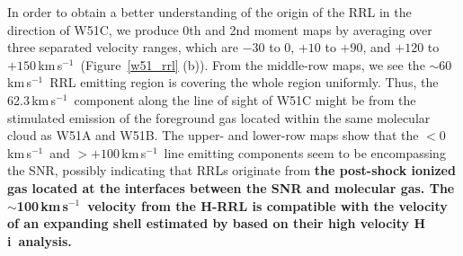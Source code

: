 \documentclass[manuscript]{aastex61}
\newcommand{\hi}{{\rm H\,}{{\sc i}}}
\newcommand{\kms}{\,km\,s$^{-1}$}
\begin{document}
In order to obtain a better understanding of the origin of the RRL in the direction of W51C, we produce 0th and 2nd moment maps by averaging over three separated velocity ranges, which are $-30$ to $0$, $+10$ to $+90$, and $+120$ to $+150$\kms\ (Figure~\ref{w51_rrl} (b)).
From the middle-row maps, we see the $\sim60$\kms\ RRL emitting region is covering the whole region uniformly. 
Thus, the 62.3\kms\ component along the line of sight of W51C might be from the stimulated emission of the foreground gas located within the same molecular cloud as W51A and W51B.
The upper- and lower-row maps show that the $<0$\kms\ and $>+100$\kms\ line emitting components seem to be encompassing the SNR, possibly indicating that RRLs originate from \textbf{the post-shock ionized gas located at the interfaces between the SNR and molecular gas.
The $\sim$100\kms\ velocity from the H-RRL is compatible with the velocity of an expanding shell estimated by \cite{Koo1997a} based on their high velocity \hi\ analysis.}
\end{document}

